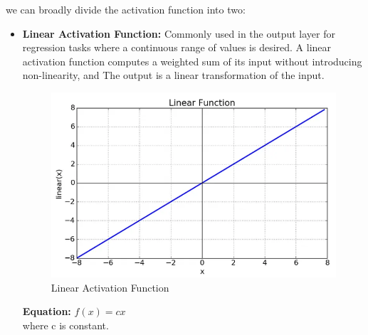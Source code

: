we can broadly divide the activation function into two: \\
\begin{itemize}
    \item \textbf{Linear Activation Function: } Commonly used in the output layer for regression tasks where a continuous range of values is desired. A linear activation function computes a weighted sum of its input without introducing non-linearity, and The output is a linear transformation of the input. 
    \begin{figure}[H]
        \centering
        \includegraphics[width=0.5\linewidth]{tex/img/Linear_function.PNG}
        \caption{Linear Activation Function}
        \label{fig:LAF}
    \end{figure}
    \textbf{Equation: }
    \(f(x)=cx\) \\where c is constant.\\
    

\end{itemize}
